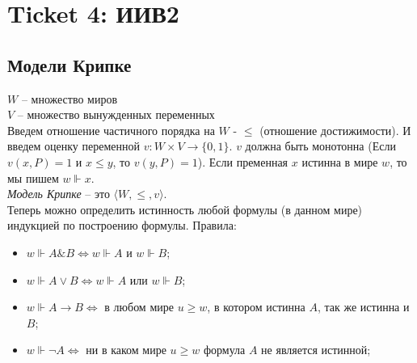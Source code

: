 \section{Ticket 4: ИИВ2}
\label{sec-6}
\subsection{Модели Крипке}
\label{sec-6-1}
$W$ -- множество миров\\
$V$ -- множество вынужденных переменных\\
Введем отношение частичного порядка на $W$ - $\leq$ (отношение достижимости). И введем оценку переменной $v: W \times V \rightarrow \lbrace 0, 1 \rbrace$. $v$ должна быть монотонна (Если $v(x, P) = 1$ и $x \leq y$, то $v(y, P) = 1$). Если пременная $x$ истинна в мире $w$, то мы пишем $w \Vdash x$.\\
\emph{Модель Крипке} -- это $\langle W, \leq, v\rangle$.\\
Теперь можно определить истинность любой формулы (в данном мире) индукцией по построению формулы. Правила:
\begin{itemize}
\item $w \Vdash A \& B \Leftrightarrow w \Vdash A$ и $w \Vdash B$;
\item $w \Vdash A \vee B \Leftrightarrow w \Vdash A$ или $w \Vdash B$;
\item $w \Vdash A \rightarrow B \Leftrightarrow$ в любом мире $u \geq w$, в котором истинна $A$, так же истинна и $B$;
\item $w \Vdash \neg A \Leftrightarrow$ ни в каком мире $u \geq w$ формула $A$ не является истинной;
\end{itemize}
